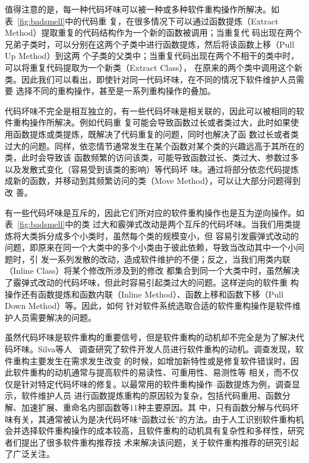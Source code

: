 值得注意的是，每一种代码坏味可以被一种或多种软件重构操作所解决。如表~\ref{fig:badsmell}中的代码重
复，在很多情况下可以通过函数提炼（Extract Method）提取重复的代码结构作为一个新的函数被调用；当重复代
码出现在两个兄弟子类时，可以分别在这两个子类中进行函数提炼，然后将该函数上移（Pull Up Method）到这两
个子类的父类中；当重复代码出现在两个不相干的类中时，可以将重复代码提取为一个新类（Extract Class），
在原来的两个类中调用这个新类。因此我们可以看出，即使针对同一代码坏味，在不同的情况下软件维护人员需要
选择不同的重构操作，甚至是一系列重构操作的叠加。

代码坏味不完全是相互独立的，有一些代码坏味是相关联的，因此可以被相同的软件重构操作所解决。例如代码重
复可能会导致函数过长或者类过大，此时如果使用函数提炼或类提炼，既解决了代码重复的问题，同时也解决了函
数过长或者类过大的问题。同样，依恋情节通常发生在某个函数对某个类的兴趣远高于其所在的类，此时会导致该
函数频繁的访问该类，可能导致函数过长、类过大、参数过多以及发散式变化（容易受到该类的影响）等代码坏
味。通过将部分依恋代码提炼成新的函数，并移动到其频繁访问的类（Move Method），可以让大部分问题得到改
善。

有一些代码坏味是互斥的，因此它们所对应的软件重构操作也是互为逆向操作。如表~\ref{fig:badsmell}中的类
过大和霰弹式改动是两个互斥的代码坏味。当我们用类提炼将大类拆分成多个小类时，虽然每个类的规模变小，但
容易引发霰弹式改动的问题，即原来在同一个大类中的多个小类由于彼此依赖，导致当改动其中一个小问题时，引
发一系列发散的改动，造成软件维护的不便；反之，当我们用类内联（Inline Class）将某个修改所涉及到的修改
都集合到同一个大类中时，虽然解决了霰弹式改动的代码坏味，但此时容易引起类过大的问题。这样逆向的软件重
构操作还有函数提炼和函数内联（Inline Method）、函数上移和函数下移（Pull Down Method）等。因此，如何
针对软件系统选取合适的软件重构操作是软件维护人员需要解决的问题。

虽然代码坏味是软件重构的重要信号，但是软件重构的动机却不完全是为了解决代码坏味。Silva等人
~\cite{Silva2016}调查研究了软件开发人员进行软件重构的动机。调查发现，软件重构主要发生在需求发生改变
的时候，如增加新特性或是修复软件错误时，因此软件重构的动机通常与提高软件的易读性、可重用性、易测性等
相关，而不仅仅是针对特定代码坏味的修复。以最常用的软件重构操作--函数提炼为例，调查显示，软件维护人员
进行函数提炼重构的原因较为复杂，包括代码重用、函数分解、加速扩展、重命名内部函数等11种主要原因。其
中，只有函数分解与代码坏味有关，其通常被认为是决代码坏味``函数过长''的方法。由于人工识别软件重构机
会并选择软件重构操作的成本较高，且软件重构的动机具有复杂性和多样性，研究者们提出了很多软件重构推荐技
术来解决该问题，关于软件重构推荐的研究引起了广泛关注。


